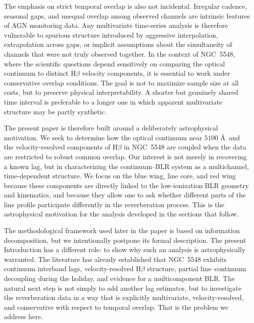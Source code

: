 \documentclass[12pt, a4paper]{article}
\begin{document}
The emphasis on strict temporal overlap is also not incidental. Irregular cadence, seasonal gaps, and unequal overlap among observed channels are intrinsic features of AGN monitoring data. Any multivariate time-series analysis is therefore vulnerable to spurious structure introduced by aggressive interpolation, extrapolation across gaps, or implicit assumptions about the simultaneity of channels that were not truly observed together. In the context of NGC~5548, where the scientific questions depend sensitively on comparing the optical continuum to distinct H$\beta$ velocity components, it is essential to work under conservative overlap conditions. The goal is not to maximize sample size at all costs, but to preserve physical interpretability. A shorter but genuinely shared time interval is preferable to a longer one in which apparent multivariate structure may be partly synthetic.

The present paper is therefore built around a deliberately astrophysical motivation. We seek to determine how the optical continuum near \(5100\) \AA\ and the velocity-resolved components of H$\beta$ in NGC~5548 are coupled when the data are restricted to robust common overlap. Our interest is not merely in recovering a known lag, but in characterizing the continuum--BLR system as a multichannel, time-dependent structure. We focus on the blue wing, line core, and red wing because these components are directly linked to the low-ionization BLR geometry and kinematics, and because they allow one to ask whether different parts of the line profile participate differently in the reverberation process. This is the astrophysical motivation for the analysis developed in the sections that follow.

The methodological framework used later in the paper is based on information decomposition, but we intentionally postpone its formal description. The present Introduction has a different role: to show why such an analysis is astrophysically warranted. The literature has already established that NGC~5548 exhibits continuum interband lags, velocity-resolved H$\beta$ structure, partial line--continuum decoupling during the holiday, and evidence for a multicomponent BLR. The natural next step is not simply to add another lag estimator, but to investigate the reverberation data in a way that is explicitly multivariate, velocity-resolved, and conservative with respect to temporal overlap. That is the problem we address here.
\end{document}
